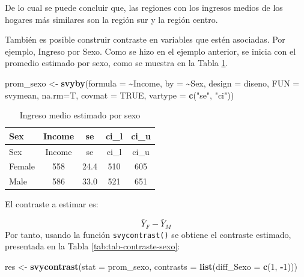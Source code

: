 \documentclass[
  spanish,
  12pt,
]{book}
\newenvironment{Shaded}{\begin{snugshade}}{\end{snugshade}}
\newcommand{\AttributeTok}[1]{\textcolor[rgb]{0.13,0.29,0.53}{#1}}
\newcommand{\ConstantTok}[1]{\textcolor[rgb]{0.56,0.35,0.01}{#1}}
\newcommand{\DecValTok}[1]{\textcolor[rgb]{0.00,0.00,0.81}{#1}}
\newcommand{\FunctionTok}[1]{\textcolor[rgb]{0.13,0.29,0.53}{\textbf{#1}}}
\newcommand{\NormalTok}[1]{#1}
\newcommand{\OtherTok}[1]{\textcolor[rgb]{0.56,0.35,0.01}{#1}}
\newcommand{\SpecialCharTok}[1]{\textcolor[rgb]{0.81,0.36,0.00}{\textbf{#1}}}
\newcommand{\StringTok}[1]{\textcolor[rgb]{0.31,0.60,0.02}{#1}}
\begin{document}
De lo cual se puede concluir que, las regiones con los ingresos medios de los hogares más similares son la región sur y la región centro.

También es posible construir contraste en variables que estén asociadas. Por ejemplo, Ingreso por Sexo. Como se hizo en el ejemplo anterior, se inicia con el promedio estimado por sexo, como se muestra en la Tabla \ref{tab:tab-prom-sexo}.

\begin{Shaded}
\begin{Highlighting}[]
\NormalTok{prom\_sexo }\OtherTok{\textless{}{-}} \FunctionTok{svyby}\NormalTok{(}\AttributeTok{formula =} \SpecialCharTok{\textasciitilde{}}\NormalTok{Income,}
                   \AttributeTok{by =} \SpecialCharTok{\textasciitilde{}}\NormalTok{Sex,}
                   \AttributeTok{design =}\NormalTok{ diseno,}
                   \AttributeTok{FUN =}\NormalTok{ svymean,}
                   \AttributeTok{na.rm=}\NormalTok{T,}
                   \AttributeTok{covmat =} \ConstantTok{TRUE}\NormalTok{,}
                   \AttributeTok{vartype =} \FunctionTok{c}\NormalTok{(}\StringTok{"se"}\NormalTok{, }\StringTok{"ci"}\NormalTok{))}
\end{Highlighting}
\end{Shaded}

\begin{longtable}[]{@{}lcccc@{}}
\caption{\label{tab:tab-prom-sexo}Ingreso medio estimado por sexo}\tabularnewline
\toprule\noalign{}
Sex & Income & se & ci\_l & ci\_u \\
\midrule\noalign{}
\endfirsthead
\toprule\noalign{}
Sex & Income & se & ci\_l & ci\_u \\
\midrule\noalign{}
\endhead
\bottomrule\noalign{}
\endlastfoot
Female & 558 & 24.4 & 510 & 605 \\
Male & 586 & 33.0 & 521 & 651 \\
\end{longtable}

El contraste a estimar es:

\[ \bar{Y}_{F} - \bar{Y}_{M}\]
Por tanto, usando la función \texttt{svycontrast()} se obtiene el contraste estimado, presentada en la Tabla \ref{tab:tab-contraste-sexo}:

\begin{Shaded}
\begin{Highlighting}[]
\NormalTok{res }\OtherTok{\textless{}{-}} \FunctionTok{svycontrast}\NormalTok{(}\AttributeTok{stat =}\NormalTok{ prom\_sexo,}
                   \AttributeTok{contrasts =} \FunctionTok{list}\NormalTok{(}\AttributeTok{diff\_Sexo =} \FunctionTok{c}\NormalTok{(}\DecValTok{1}\NormalTok{, }\SpecialCharTok{{-}}\DecValTok{1}\NormalTok{)))}
\end{Highlighting}
\end{Shaded}
\end{document}
